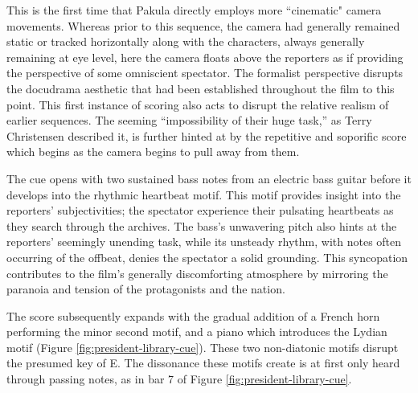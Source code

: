 This is the first time that Pakula directly employs more ``cinematic" camera movements.
Whereas prior to this sequence, the camera had generally remained static or tracked horizontally along with the characters, always generally remaining at eye level, here the camera floats above the reporters as if providing the perspective of some omniscient spectator.
The formalist perspective disrupts the docudrama aesthetic that had been established throughout the film to this point.
This first instance of scoring also acts to disrupt the relative realism of earlier sequences.
The seeming ``impossibility of their huge task,” as Terry Christensen described it, is further hinted at by the repetitive and soporific score which begins as the camera begins to pull away from them.\autocites[][133]{christensen_reel_1987}

The cue opens with two sustained bass notes from an electric bass guitar before it develops into the rhythmic heartbeat motif.
This motif provides insight into the reporters' subjectivities; the spectator experience their pulsating heartbeats as they search through the archives.
The bass's unwavering pitch also hints at the reporters' seemingly unending task, while its unsteady rhythm, with notes often occurring of the offbeat, denies the spectator a solid grounding.
This syncopation contributes to the film's generally discomforting atmosphere by mirroring the paranoia and tension of the protagonists and the nation.

The score subsequently expands with the gradual addition of a French horn performing the minor second motif, and a piano which introduces the Lydian motif (Figure \ref{fig:president-library-cue}).
These two non-diatonic motifs disrupt the presumed key of E\flat.
The dissonance these motifs create is at first only heard through passing notes, as in bar 7 of Figure \ref{fig:president-library-cue}.

